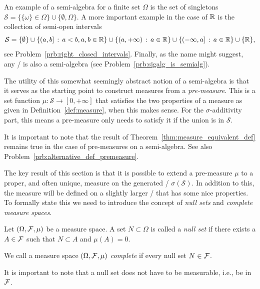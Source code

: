 An example of a semi-algebra for a finite set $\Omega$ is the set of singletons $\mathcal{S} = \{\{\omega\} \in \Omega\} \cup \{\emptyset, \Omega\}$. A more important example in the case of $\mathbb R$ is the collection of semi-open intervals
\begin{equation}\label{def:right_closed_intervals}
	\mathcal{S} = \{\emptyset\} \cup \{(a,b] \, : \, a < b, a, b \in \mathbb R\} \cup \{(a,+\infty) \, : \, a \in \mathbb R\} \cup \{(-\infty, a] \, : \, a \in \mathbb R \} \cup \{\mathbb R\},
\end{equation}
see Problem~\ref{prb:right_closed_intervals}. Finally, as the name might suggest, any \sigalg/ is also a semi-algebra (see Problem~\ref{prb:sigalg_is_semialg}).

The utility of this somewhat seemingly abstract notion of a semi-algebra is that it serves as the starting point to construct measures from a \emph{pre-measure}. This is a set function $\mu : \mathcal{S} \to [0,+\infty]$  that satisfies the two properties of a measure as given in Definition~\ref{def:measure}, when this makes sense. For the $\sigma$-additivity part, this means a pre-measure only needs to satisfy it if the union is in $\mathcal{S}$.  

\begin{remark}
It is important to note that the result of Theorem~\ref{thm:measure_equivalent_def} remains true in the case of pre-measures on a semi-algebra. See also Problem~\ref{prb:alternative_def_premeasure}.
\end{remark}

The key result of this section is that it is possible to extend a pre-measure $\mu$ to a proper, and often unique, measure on the generated \sigalg/ $\sigma(\mathcal{S})$. In addition to this, the measure will be defined on a slightly larger \sigalg/ that has some nice properties. To formally state this we need to introduce the concept of \emph{null sets} and \emph{complete measure spaces}.

\begin{definition}
Let $(\Omega, \mathcal F, \mu)$ be a measure space. A set $N \subset \Omega$ is called a \emph{null set} if there exists a $A \in \mathcal F$ such that $N \subset A$ and $\mu(A) = 0$.

We call a measure space $(\Omega, \mathcal F, \mu)$ \emph{complete} if every null set $N \in \mathcal F$. 
\end{definition}

It is important to note that a null set does not have to be measurable, i.e., be in $\mathcal F$. 

